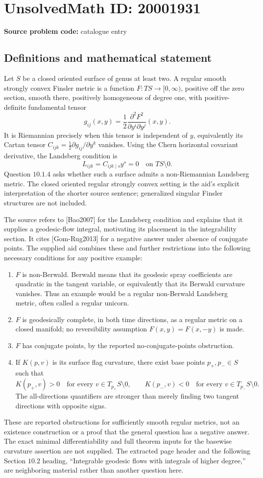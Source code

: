\documentclass[11pt]{article}
\begin{document}
\section*{UnsolvedMath ID: 20001931}
\textbf{Source problem code:} catalogue entry
\subsection{Definitions and mathematical statement}
Let \(S\) be a closed oriented surface of genus at least two. A regular smooth strongly convex Finsler metric is a function \(F:TS\to[0,\infty)\), positive off the zero section, smooth there, positively homogeneous of degree one, with positive-definite fundamental tensor
\[
 g_{ij}(x,y)=\frac12\frac{\partial^2F^2}{\partial y^i\partial y^j}(x,y).
\]
It is Riemannian precisely when this tensor is independent of \(y\), equivalently its Cartan tensor \(C_{ijk}=\tfrac12\partial g_{ij}/\partial y^k\) vanishes. Using the Chern horizontal covariant derivative, the Landsberg condition is
\[
 L_{ijk}=C_{ijk\mid s}y^s=0\quad\text{on }TS\setminus0.
\]
Question \(10.1.4\) asks whether such a surface admits a non-Riemannian Landsberg metric. The closed oriented regular strongly convex setting is the aid's explicit interpretation of the shorter source sentence; generalized singular Finsler structures are not included.

The source refers to [Bao2007] for the Landsberg condition and explains that it supplies a geodesic-flow integral, motivating its placement in the integrability section. It cites [Gom-Rug2013] for a negative answer under absence of conjugate points. The supplied aid combines these and further restrictions into the following necessary conditions for any positive example:
\begin{enumerate}
\item \(F\) is non-Berwald. Berwald means that its geodesic spray coefficients are quadratic in the tangent variable, or equivalently that its Berwald curvature vanishes. Thus an example would be a regular non-Berwald Landsberg metric, often called a regular unicorn.
\item \(F\) is geodesically complete, in both time directions, as a regular metric on a closed manifold; no reversibility assumption \(F(x,y)=F(x,-y)\) is made.
\item \(F\) has conjugate points, by the reported no-conjugate-points obstruction.
\item If \(K(p,v)\) is its surface flag curvature, there exist base points \(p_+,p_-\in S\) such that
\[
 K(p_+,v)>0\quad\text{for every }v\in T_{p_+}S\setminus0,
 \qquad
 K(p_-,v)<0\quad\text{for every }v\in T_{p_-}S\setminus0.
\]
The all-directions quantifiers are stronger than merely finding two tangent directions with opposite signs.
\end{enumerate}
These are reported obstructions for sufficiently smooth regular metrics, not an existence construction or a proof that the general question has a negative answer. The exact minimal differentiability and full theorem inputs for the basewise curvature assertion are not supplied. The extracted page header and the following Section \(10.2\) heading, ``Integrable geodesic flows with integrals of higher degree,'' are neighboring material rather than another question here.
\end{document}

